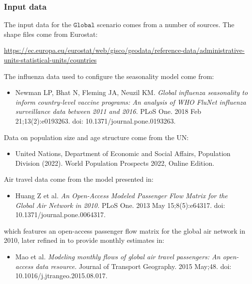 \documentclass[10pt,letterpaper]{article}
\begin{document}
\subsubsection*{Input data}

The input data for the $\texttt{Global}$ scenario comes from a number of sources. The shape files come from Eurostat:

\begin{center}
\url{https://ec.europa.eu/eurostat/web/gisco/geodata/reference-data/administrative-units-statistical-units/countries}
\end{center}

\noindent The influenza data used to configure the seasonality model come from:

\begin{itemize}
\item[] Newman LP, Bhat N, Fleming JA, Neuzil KM. \textit{Global influenza seasonality to inform country-level vaccine programs: An analysis of WHO FluNet influenza surveillance data between 2011 and 2016.} PLoS One. 2018 Feb 21;13(2):e0193263. doi: 10.1371/journal.pone.0193263.
\end{itemize}

\noindent Data on population size and age structure come from the UN:

\begin{itemize}
\item[] United Nations, Department of Economic and Social Affairs, Population Division (2022). World Population Prospects 2022, Online Edition.
\end{itemize}

\noindent Air travel data come from the model presented in:

\begin{itemize}
\item[] Huang Z et al. \textit{An Open-Access Modeled Passenger Flow Matrix for the Global Air Network in 2010.} PLoS One. 2013 May 15;8(5):e64317. doi: 10.1371/journal.pone.0064317.
\end{itemize}

\noindent which features an open-access passenger flow matrix for the global air network in 2010, later refined in to provide monthly estimates in:

\begin{itemize}
\item[] Mao et al. \textit{Modeling monthly flows of global air travel passengers: An open-access data resource.} Journal of Transport Geography. 2015 May;48. doi: 10.1016/j.jtrangeo.2015.08.017.
\end{itemize}
\end{document}
